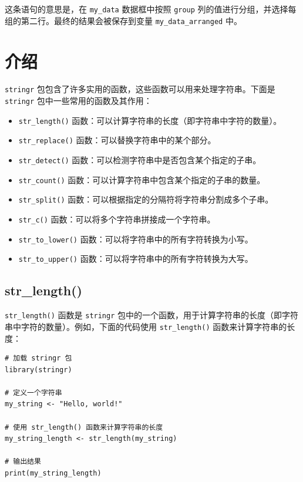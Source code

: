 \documentclass[
  letterpaper,
  DIV=11,
  numbers=noendperiod]{scrreprt}
\providecommand{\tightlist}{%
  \setlength{\itemsep}{0pt}\setlength{\parskip}{0pt}}\usepackage{longtable,booktabs,array}
\begin{document}
这条语句的意思是，在 \texttt{my\_data} 数据框中按照 \texttt{group}
列的值进行分组，并选择每组的第二行。最终的结果会被保存到变量
\texttt{my\_data\_arranged} 中。

\hypertarget{section-1}{%
\chapter{}\label{section-1}}

\hypertarget{ux4ecbux7ecd-1}{%
\chapter{介绍}\label{ux4ecbux7ecd-1}}

\texttt{stringr}
包包含了许多实用的函数，这些函数可以用来处理字符串。下面是
\texttt{stringr} 包中一些常用的函数及其作用：

\begin{itemize}
\tightlist
\item
  \texttt{str\_length()}
  函数：可以计算字符串的长度（即字符串中字符的数量）。
\item
  \texttt{str\_replace()} 函数：可以替换字符串中的某个部分。
\item
  \texttt{str\_detect()} 函数：可以检测字符串中是否包含某个指定的子串。
\item
  \texttt{str\_count()} 函数：可以计算字符串中包含某个指定的子串的数量。
\item
  \texttt{str\_split()}
  函数：可以根据指定的分隔符将字符串分割成多个子串。
\item
  \texttt{str\_c()} 函数：可以将多个字符串拼接成一个字符串。
\item
  \texttt{str\_to\_lower()} 函数：可以将字符串中的所有字符转换为小写。
\item
  \texttt{str\_to\_upper()} 函数：可以将字符串中的所有字符转换为大写。
\end{itemize}

\hypertarget{str_length}{%
\section{str\_length()}\label{str_length}}

\texttt{str\_length()} 函数是 \texttt{stringr}
包中的一个函数，用于计算字符串的长度（即字符串中字符的数量）。例如，下面的代码使用
\texttt{str\_length()} 函数来计算字符串的长度：

\begin{verbatim}
# 加载 stringr 包
library(stringr)

# 定义一个字符串
my_string <- "Hello, world!"

# 使用 str_length() 函数来计算字符串的长度
my_string_length <- str_length(my_string)

# 输出结果
print(my_string_length)
\end{verbatim}
\end{document}
